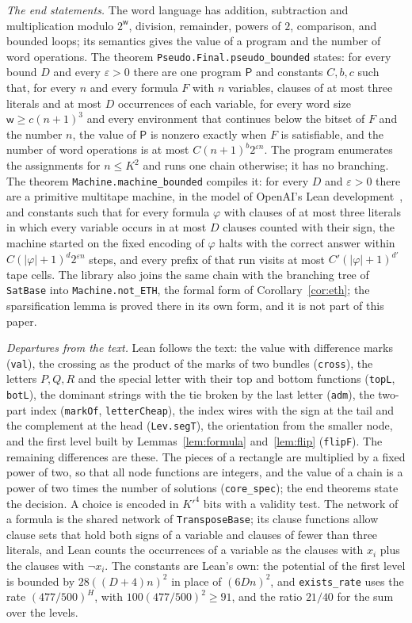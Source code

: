 \documentclass[11pt]{article}
\newcommand{\lean}[1]{\texttt{#1}}
\begin{document}
\emph{The end statements.} The word language has addition, subtraction and multiplication modulo $2^{\mathsf w}$, division, remainder, powers of $2$, comparison, and bounded loops; its semantics gives the value of a program and the number of word operations. The theorem \lean{Pseudo.Final.pseudo\_bounded} states: for every bound $D$ and every $\varepsilon>0$ there are one program $\mathsf P$ and constants $C,b,c$ such that, for every $n$ and every formula $F$ with $n$ variables, clauses of at most three literals and at most $D$ occurrences of each variable, for every word size $\mathsf w\ge c(n+1)^3$ and every environment that continues below the bitset of $F$ and the number $n$, the value of $\mathsf P$ is nonzero exactly when $F$ is satisfiable, and the number of word operations is at most $C(n+1)^b2^{\varepsilon n}$. The program enumerates the assignments for $n\le K^2$ and runs one chain otherwise; it has no branching. The theorem \lean{Machine.machine\_bounded} compiles it: for every $D$ and $\varepsilon>0$ there are a primitive multitape machine, in the model of OpenAI's Lean development~\cite{OAIlean}, and constants such that for every formula $\varphi$ with clauses of at most three literals in which every variable occurs in at most $D$ clauses counted with their sign, the machine started on the fixed encoding of $\varphi$ halts with the correct answer within $C(|\varphi|+1)^d2^{\varepsilon n}$ steps, and every prefix of that run visits at most $C'(|\varphi|+1)^{d'}$ tape cells. The library also joins the same chain with the branching tree of \lean{SatBase} into \lean{Machine.not\_ETH}, the formal form of Corollary~\ref{cor:eth}; the sparsification lemma is proved there in its own form, and it is not part of this paper.

\emph{Departures from the text.} Lean follows the text: the value with difference marks (\lean{val}), the crossing as the product of the marks of two bundles (\lean{cross}), the letters $P,Q,R$ and the special letter with their top and bottom functions (\lean{topL}, \lean{botL}), the dominant strings with the tie broken by the last letter (\lean{adm}), the two-part index (\lean{markOf}, \lean{letterCheap}), the index wires with the sign at the tail and the complement at the head (\lean{Lev.segT}), the orientation from the smaller node, and the first level built by Lemmas~\ref{lem:formula} and~\ref{lem:flip} (\lean{flipF}). The remaining differences are these. The pieces of a rectangle are multiplied by a fixed power of two, so that all node functions are integers, and the value of a chain is a power of two times the number of solutions (\lean{core\_spec}); the end theorems state the decision. A choice is encoded in $K'^4$ bits with a validity test. The network of a formula is the shared network of \lean{TransposeBase}; its clause functions allow clause sets that hold both signs of a variable and clauses of fewer than three literals, and Lean counts the occurrences of a variable as the clauses with $x_i$ plus the clauses with $\neg x_i$. The constants are Lean's own: the potential of the first level is bounded by $28((D+4)n)^2$ in place of $(6Dn)^2$, and \lean{exists\_rate} uses the rate $(477/500)^H$, with $100(477/500)^2\ge91$, and the ratio $21/40$ for the sum over the levels.
\end{document}
